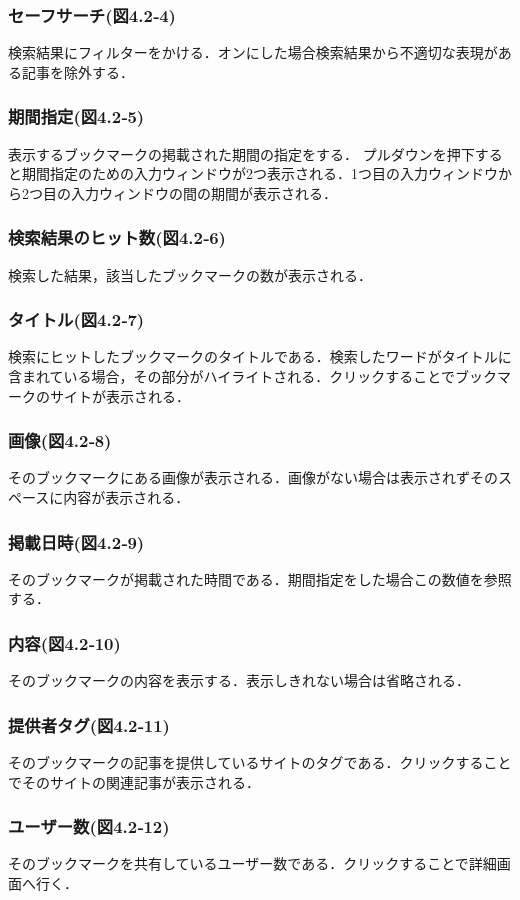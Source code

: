 \subsubsection{セーフサーチ(図4.2‐4)}
検索結果にフィルターをかける．オンにした場合検索結果から不適切な表現がある記事を除外する．
\subsubsection{期間指定(図4.2‐5)}
表示するブックマークの掲載された期間の指定をする．
プルダウンを押下すると期間指定のための入力ウィンドウが2つ表示される．1つ目の入力ウィンドウから2つ目の入力ウィンドウの間の期間が表示される．
\subsubsection{検索結果のヒット数(図4.2‐6)}
検索した結果，該当したブックマークの数が表示される．
\subsubsection{タイトル(図4.2‐7)}
検索にヒットしたブックマークのタイトルである．検索したワードがタイトルに含まれている場合，その部分がハイライトされる．クリックすることでブックマークのサイトが表示される．
\subsubsection{画像(図4.2‐8)}
そのブックマークにある画像が表示される．画像がない場合は表示されずそのスペースに内容が表示される．
\subsubsection{掲載日時(図4.2‐9)}
そのブックマークが掲載された時間である．期間指定をした場合この数値を参照する．
\subsubsection{内容(図4.2‐10)}
そのブックマークの内容を表示する．表示しきれない場合は省略される．
\subsubsection{提供者タグ(図4.2‐11)}
そのブックマークの記事を提供しているサイトのタグである．クリックすることでそのサイトの関連記事が表示される．
\subsubsection{ユーザー数(図4.2‐12)}
そのブックマークを共有しているユーザー数である．クリックすることで詳細画面へ行く．

